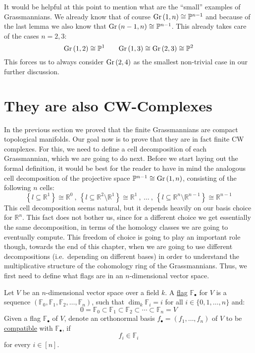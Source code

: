 It would be helpful at this point to mention what are the ``small'' examples of Grassmannians. We already know that of course $\Gr{1}{n}\cong\mathbb{P}^{n-1}$ and because of the last lemma we also know that $\Gr{n-1}{n}\cong\mathbb{P}^{n-1}$. This already takes care of the cases $n=2,3$:
\[\Gr{1}{2}\cong\mathbb{P}^1\qquad\Gr{1}{3}\cong\Gr{2}{3}\cong\mathbb{P}^2\]
This forces us to always consider $\Gr{2}{4}$ as the smallest non-trivial case in our further discussion.

\section{They are also CW-Complexes}
In the previous section we proved that the finite Grassmannians are compact topological manifolds. Our goal now is to prove that they are in fact finite CW complexes. For this, we need to define a cell decomposition of each Grassmannian, which we are going to do next. Before we start laying out the formal definition, it would be best for the reader to have in mind the analogous cell decomposition of the projective space $\mathbb{P}^{n-1}\cong\Gr{1}{n}$, consisting of the following $n$ cells:
\[\left\{l\subseteq\mathbb{R}^1\right\}\cong\mathbb{R}^0\ ,\ \left\{l\subseteq\mathbb{R}^2\setminus\mathbb{R}^1\right\}\cong\mathbb{R}^1\ ,\ \ldots\ ,\ \left\{l\subseteq\mathbb{R}^n\setminus\mathbb{R}^{n-1}\right\}\cong\mathbb{R}^{n-1}\]
This cell decomposition seems natural, but it depends heavily on our basis choice for $\mathbb{R}^n$. This fact does not bother us, since for a different choice we get essentially the same decomposition, in terms of the homology classes we are going to eventually compute. This freedom of choice is going to play an important role though, towards the end of this chapter, when we are going to use different decompositions (i.e.\ depending on different bases) in order to understand the multiplicative structure of the cohomology ring of the Grassmannians. Thus, we first need to define what flags are in an $n$-dimensional vector space.

\begin{definition} Let $V$ be an $n$-dimensional vector space over a field $k$. A \ul{flag} $\mathbb{F}_{\bullet}$ for $V$ is a sequence $\left(\mathbb{F}_0,\mathbb{F}_1,\mathbb{F}_2,\ldots,\mathbb{F}_n\right)$, such that $\dim_k\mathbb{F}_i = i$ for all $i\in\{0,1,\ldots,n\}$ and:
\[0=\mathbb{F}_0\subset\mathbb{F}_1\subset\mathbb{F}_2\subset\cdots\subset\mathbb{F}_n=V\]
Given a flag $\mathbb{F}_{\bullet}$ of $V$, denote an orthonormal basis $f_{\bullet}=(f_1,\ldots,f_n)$ of $V$ to be \ul{compatible} with $\mathbb{F}_{\bullet}$, if
\[f_i\in\mathbb{F}_i\]
for every $i\in[n]$.
\end{definition}

